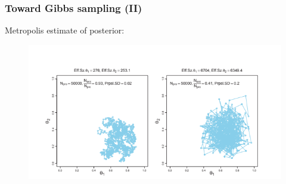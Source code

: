 \documentclass[usenames,dvipsnames,table]{beamer}
\begin{document}
\begin{frame}
\frametitle{Toward Gibbs sampling (II)}
Metropolis estimate of posterior:
\begin{figure}
\centering
\includegraphics[height=0.7\textheight]{img/fig7_6}
\end{figure}
\end{frame}
\end{document}
